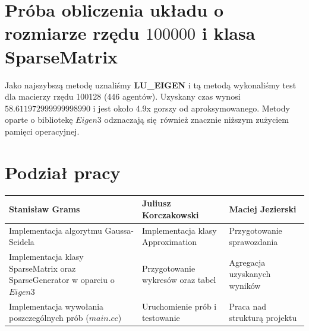\documentclass[10pt]{article}
\begin{document}
\section{Próba obliczenia układu o rozmiarze rzędu $100 000$ i klasa SparseMatrix}
	Jako najszybszą metodę uznaliśmy \textbf{LU\_EIGEN} i tą metodą wykonaliśmy test dla macierzy rzędu \num{100128} (\num{446} agentów).
	Uzyskany czas wynosi \textbf{$58.611972999999998990$} i jest około 4.9x gorszy od aproksymowanego.
	Metody oparte o bibliotekę $Eigen3$ odznaczają się również znacznie niższym zużyciem pamięci operacyjnej.

\section{Podział pracy}
\begin{center}
	\begin{tabular}{| p{6cm} | p{6cm} | p{6cm} |}
		\hline
		\textbf{Stanisław Grams} & \textbf{Juliusz Korczakowski} & \textbf{Maciej Jezierski} \\ \hline
		Implementacja algorytmu Gaussa-Seidela & Implementacja klasy Approximation & Przygotowanie sprawozdania  \\ \hline
		Implementacja klasy SparseMatrix oraz SparseGenerator w oparciu o $Eigen3$ & Przygotowanie wykresów oraz tabel & Agregacja uzyskanych wyników \\ \hline
		Implementacja wywołania poszczególnych prób ($main.cc$) & Uruchomienie prób i testowanie & Praca nad strukturą projektu\\ \hline
	\end{tabular}
\end{center}
\end{document}
